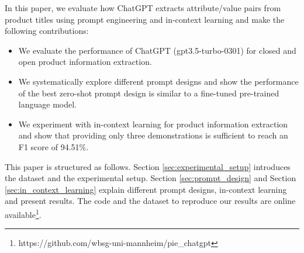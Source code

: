 In this paper, we evaluate how ChatGPT extracts attribute/value pairs from product titles using prompt engineering and in-context learning
and make the following contributions:
\begin{itemize}
    \item We evaluate the performance of ChatGPT (gpt3.5-turbo-0301) for closed and open product information extraction.
    \item We systematically explore different prompt designs and show the performance of the best zero-shot prompt design is similar to a fine-tuned pre-trained language model.
    \item We experiment with in-context learning for product information extraction and show that providing only three demonstrations is sufficient to reach an F1 score of 94.51\%.
\end{itemize}

This paper is structured as follows. Section \ref{sec:experimental_setup} introduces the dataset and the experimental setup. Section \ref{sec:prompt_design} and Section \ref{sec:in_context_learning} explain different prompt designs, in-context learning and present results. The code and the dataset to reproduce our results are online available\footnote{https://github.com/wbsg-uni-mannheim/pie\_chatgpt}.
